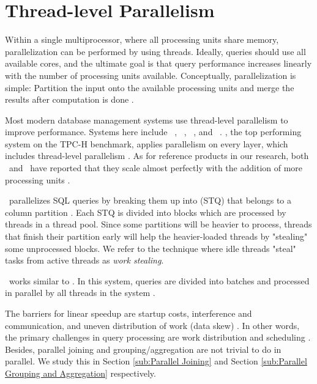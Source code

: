 \section{Thread-level Parallelism}
\label{sec:Thread-lever Parallelism}
Within a single multiprocessor, where all processing units share memory, parallelization can be performed by using threads. Ideally, queries should use all available cores, and the ultimate goal is that query performance increases linearly with the number of processing units available. Conceptually, parallelization is simple: Partition the input onto the available processing units and merge the results after computation is done \cite{Neumann2011-uq}.

Most modern database management systems use thread-level parallelism to improve performance. Systems here include \vertica~\cite{Lamb2012-kg}, \mssql~\cite{Larson2013-mc}, \blink~\cite{Barber2012-xt, Johnson2008-cp}, and \saph~\cite{Farber2012-vh}. \exasol, the top performing system on the TPC-H benchmark, applies parallelism on every layer, which includes thread-level parallelism \cite{Exasol2014-xh}. As for reference products in our research, both \qlikview~and \tableau~have reported that they scale almost perfectly with the addition of more processing units \cite{Kamkolkar2015-iq, Qlik2011-ef}. 

\blink~parallelizes SQL queries by breaking them up into  (STQ) that belongs to a column partition \cite{Barber2012-xt}. Each STQ is divided into blocks which are processed by threads in a thread pool. Since some partitions will be heavier to process, threads that finish their partition early will help the heavier-loaded threads by "stealing" some unprocessed blocks. We refer to the technique where idle threads "steal" tasks from active threads as \textit{work stealing}. 

\mssql~works similar to \blink. In this system, queries are divided into batches and processed in parallel by all threads in the system \cite{Larson2013-mc}.

The barriers for linear speedup are startup costs, interference and communication, and uneven distribution of work (data skew) \cite{DeWitt1992-ki}. In other words, the primary challenges in query processing are work distribution and scheduling \cite{Neumann2011-uq}. Besides, parallel joining and grouping/aggregation are not trivial to do in parallel. We study this in Section \ref{sub:Parallel Joining} and Section \ref{sub:Parallel Grouping and Aggregation} respectively.

